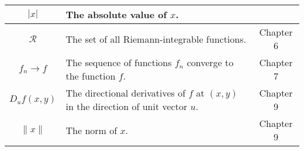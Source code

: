 \begin{table}[h]
{\begin{minipage}{\textwidth}
\begin{tabular}{|c|l|c|}
			$|x|$          & The absolute value of $x$.                                                          &            \\ \hline
			$\mathcal{R}$  & The set of all Riemann-integrable functions.                                        & Chapter 6  \\ \hline
			$f_n\to f$     & The sequence of functions $f_n$ converge to the function $f$.                       & Chapter 7  \\ \hline
			$D_uf(x,y)$    & The directional derivatives of $f$ at $(x, y)$ in the direction of unit vector $u$. & Chapter 9  \\ \hline
			$\|x \|$       & The norm of $x$.                                                                    & Chapter 9  \\ \hline
		\end{tabular}
\end{minipage} }
\end{table}

\thispagestyle{plain}

